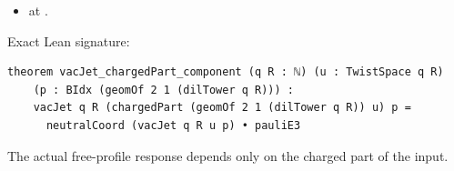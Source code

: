 \begin{theorem}[bp-181]
\begin{itemize}
\item \texttt{} at \texttt{}.
\end{itemize}
\par Exact Lean signature:
\begin{verbatim}
theorem vacJet_chargedPart_component (q R : ℕ) (u : TwistSpace q R)
    (p : BIdx (geomOf 2 1 (dilTower q R))) :
    vacJet q R (chargedPart (geomOf 2 1 (dilTower q R)) u) p =
      neutralCoord (vacJet q R u p) • pauliE3
\end{verbatim}
\end{theorem}

\begin{theorem}[bp-182]
\label{bp-182}
\uses{}
\leanok
The actual free-profile response depends only on the charged part of the input.


\end{theorem}
